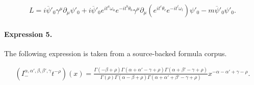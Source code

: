 \documentclass[11pt]{article}
\begin{document}
\begin{align*}L=i\overline{\psi}'_{0}{\gamma}^{\mu}{\partial}_{\mu}{\psi}'_{0}+i\overline{\psi}'_{0}e^{i{t}^{a}{\omega}_{a}}e^{-i{t}^{b}{\theta}_{b}}{\gamma}^{\mu}\partial_{\mu}\left (e^{i{t}^{c}{\theta}_{c}}e^{-i{t}^{l}{\omega}_{l}} \right ){\psi}'_{0}-m\overline{\psi}'_{0}{\psi}'_{0}.\end{align*}

\paragraph{Expression 5.} The following expression is taken from a source-backed formula corpus.

\begin{align*}\left(I_{-}^{\alpha,\alpha',\beta,\beta',\gamma}t^{-\rho}\right)(x)=\frac{\Gamma(-\beta+\rho)\Gamma(\alpha+\alpha'-\gamma+\rho)\Gamma(\alpha+\beta'-\gamma+\rho)}{\Gamma(\rho)\Gamma(\alpha-\beta+\rho)\Gamma(\alpha+\alpha'+\beta'-\gamma+\rho)}x^{-\alpha-\alpha'+\gamma-\rho}.\end{align*}
\end{document}
